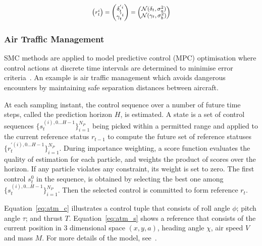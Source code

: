 \begin{equation}
\footnotesize
\begin{aligned}
  \begin{pmatrix}
    r^i_{t}    \\ 
  \end{pmatrix}
  =
  \begin{pmatrix}
    \delta^{'i}_{t}    \\ 
    \gamma^{'i}_{t}    \\ 
  \end{pmatrix}
  =
  \begin{pmatrix}
  	\mathcal{N}(\delta_{t},\sigma_a^2) \\
		\mathcal{N}(\gamma_{t},\sigma_b^2) \\
  \end{pmatrix}
\end{aligned}
\label{eq:mcl_r}
\end{equation}


\subsubsection{Air Traffic Management}
\label{sec:atm}

SMC methods are applied to model predictive control (MPC) optimisation where control actions at discrete time intervals are determined to minimise error criteria~\cite{kantas09}.
An example is air traffic management which avoids dangerous encounters by maintaining safe separation distances between aircraft.

At each sampling instant, the control sequence over a number of future time steps, called the prediction horizon $H$, is estimated.
A state is a set of control sequences $\{s_t^{(i),0...H-1}\}^{N_P}_{i=1}$ being picked within a permitted range and applied to the current reference status $r_{t-1}$ to compute the future set of reference statuses $\{r_t^{'{(i),0...H-1}}\}^{N_P}_{i=1}$.
During importance weighting, a score function evaluates the quality of estimation for each particle, and weights the product of scores over the horizon.
If any particle violates any constraint, its weight is set to zero.
The first control $s_{t}^0$ in the sequence, is obtained by selecting the best one among $\{s_t^{(i),0...H-1}\}^{N_P}_{i=1}$.
Then the selected control is committed to form reference $r_t$.

Equation~\ref{eq:atm_c} illustrates a control tuple that consists of roll angle $\phi$; pitch angle $\tau$; and thrust $T$.
Equation~\ref{eq:atm_s} shows a reference that consists of the current position in 3 dimensional space $(x,y,a)$, heading angle $\chi$, air speed $V$ and mass $M$. 
For more details of the model, see~\cite{eele13}.

